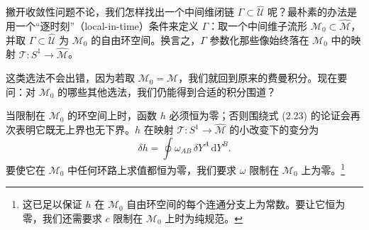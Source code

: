 \documentclass[11pt,a4paper,UTF8]{ctexart}
\theoremstyle{plain}
\theoremstyle{definition}
\begin{document}

撇开收敛性问题不论，我们怎样找出一个中间维闭链 $\Gamma\subset\widehat{\mathcal U}$ 呢？最朴素的办法是用一个“逐时刻”（local-in-time）条件来定义 $\Gamma$：取一个中间维子流形 $\mathcal M_0\subset\widehat{\mathcal M}$，并取 $\Gamma\subset\widehat{\mathcal U}$ 为 $\mathcal M_0$ 的自由环空间。换言之，$\Gamma$ 参数化那些像始终落在 $\mathcal M_0$ 中的映射 $\mathcal T:S^1\to\widehat{\mathcal M}$。

这类选法不会出错，因为若取 $\mathcal M_0=\mathcal M$，我们就回到原来的费曼积分。现在要问：对 $\mathcal M_0$ 的哪些其他选法，我们仍能得到合适的积分围道？

当限制在 $\mathcal M_0$ 的环空间上时，函数 $h$ 必须恒为零；否则围绕式 (2.23) 的论证会再次表明它既无上界也无下界。$h$ 在映射 $\mathcal T:S^1\to\widehat{\mathcal M}$ 的小改变下的变分为
\begin{equation}
    \delta h=\oint \omega_{AB}\,\delta Y^A\,\mathrm{d}Y^B .
    \tag{2.24}
\end{equation}
要使它在 $\mathcal M_0$ 中任何环路上求值都恒为零，我们要求 $\omega$ 限制在 $\mathcal M_0$ 上为零。\footnote[5]{这已足以保证 $h$ 在 $\mathcal M_0$ 自由环空间的每个连通分支上为常数。要让它恒为零，我们还需要求 $c$ 限制在 $\mathcal M_0$ 上时为纯规范。}


\end{document}

